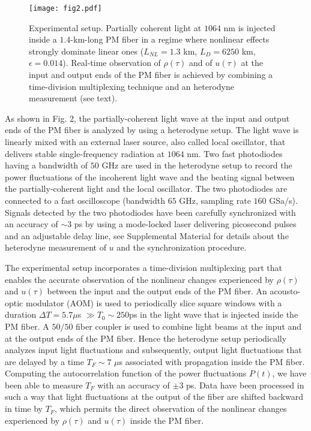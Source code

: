 \documentclass[twocolumn,preprintnumbers,amsmath,amssymb,superscriptaddress]{revtex4}
\begin{document}
\begin{figure}[h]
\texttt{[image: fig2.pdf]}
\caption{Experimental setup. Partially coherent light at $1064$ nm  is
  injected inside a $1.4$-km-long PM fiber in a regime where nonlinear
  effects strongly  dominate linear ones ($L_{NL}=1.3$ km,
  $L_{D}=6250$ km, $\epsilon=0.014$). Real-time observation  of
  $\rho(\tau)$ and of $u(\tau)$ at the input and output ends of the  PM
  fiber is achieved by combining a time-division multiplexing
  technique  and an heterodyne measurement (see text).}
\end{figure}


As shown in Fig. 2, the partially-coherent light wave at the input and
output ends  of the PM fiber is analyzed by using a heterodyne
setup. The light wave is linearly mixed with an external
laser source, also called local oscillator, that delivers stable
single-frequency radiation at $1064$ nm. Two fast photodiodes  having
a bandwidth of $50$ GHz are used in the heterodyne setup
to record the power fluctuations of the incoherent light wave
and the beating signal between the partially-coherent light and 
the local oscillator. The two photodiodes are connected to a fast oscilloscope 
(bandwidth $65$ GHz, sampling rate $160$ GSa/s). Signals detected by
the two photodiodes  have been carefully synchronized with an accuracy
of $\sim 3$ ps  by using a mode-locked laser delivering picosecond
pulses and an adjustable delay line, see Supplemental Material for 
details about the heterodyne measurement of $u$ and the synchronization procedure. 

The experimental setup incorporates
a time-division  multiplexing part that enables the accurate
observation of the nonlinear changes  experienced by $\rho(\tau)$ and
$u(\tau)$ between the input and the output ends of the  PM fiber. 
An acousto-optic modulator (AOM) is used to
periodically slice square windows with a duration $\Delta T=5.7 \mu$s $\gg T_0\sim 250$ps 
in the light wave that is injected inside the PM fiber. 
A $50/50$ fiber coupler is used to combine
light beams at the input and at the output ends of the PM fiber. 
Hence the heterodyne setup periodically analyzes input light fluctuations 
and subsequently, output light fluctuations that are delayed by a time $T_F \sim 7$ $\mu$s 
associated with propagation inside the PM fiber.  Computing the
autocorrelation function of the power fluctuations $P(t)$,  we have
been able to measure $T_F$ with an accuracy of $\pm 3$ ps. 
Data  have been processed in
such a way that light fluctuations at the output  of the fiber are
shifted backward in time by $T_F$, which permits the direct
observation of the nonlinear changes experienced by $\rho(\tau)$ 
and $u(\tau)$ inside the PM fiber. 
\end{document}
